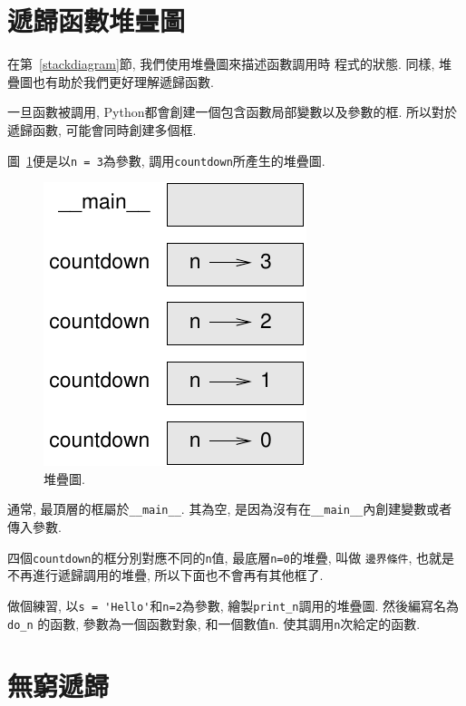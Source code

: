 \documentclass[10pt]{book}
\begin{document}
\section{遞歸函數堆疊圖}
\label{recursive.stack}

在第~\ref{stackdiagram}節, 我們使用堆疊圖來描述函數調用時
程式的狀態. 
同樣, 堆疊圖也有助於我們更好理解遞歸函數. 

一旦函數被調用, Python都會創建一個包含函數局部變數以及參數的框. 
所以對於遞歸函數, 可能會同時創建多個框. 

圖~\ref{fig.stack2}便是以{\tt n = 3}為參數, 調用{\tt countdown}所產生的堆疊圖. 

\begin{figure}
\centerline
{\includegraphics[scale=0.8]{figs/stack2.pdf}}
\caption{堆疊圖.}
\label{fig.stack2}
\end{figure}

通常, 最頂層的框屬於\verb"__main__". 
其為空, 是因為沒有在\verb"__main__"內創建變數或者傳入參數. 

四個{\tt countdown}的框分別對應不同的{\tt n}值, 最底層{\tt n=0}的堆疊, 叫做
{\tt 邊界條件},  也就是不再進行遞歸調用的堆疊, 所以下面也不會再有其他框了. 

做個練習, 以\verb"s = 'Hello'"和{\tt n=2}為參數, 繪製\verb"print_n"調用的堆疊圖. 
然後編寫名為 \verb"do_n" 的函數, 參數為一個函數對象, 和一個數值{\tt n}. 
使其調用{\tt n}次給定的函數. 


\section{無窮遞歸}
\end{document}
